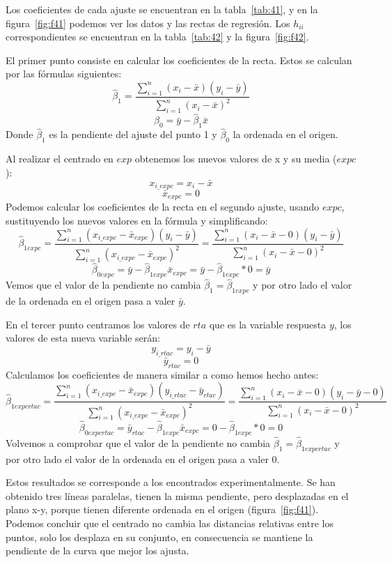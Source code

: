 \documentclass[a4paper]{article}
\begin{document}
Los coeficientes de cada ajuste se encuentran en la tabla~\ref{tab:41}, y en la figura~\ref{fig:f41} podemos ver los datos y las rectas de regresión. Los $h_{ii}$ correspondientes se encuentran en la tabla~\ref{tab:42} y la figura~\ref{fig:f42}. \par

El primer punto consiste en calcular los coeficientes de la recta. Estos se calculan por las fórmulas siguientes: 
\[ \hat{\beta}_1 = \frac{\sum_{i=1}^n(x_i - \bar{x})(y_i - \bar{y})}{\sum_{i=1}^n(x_{i} - \bar{x})^2} \]
\[ \hat{\beta}_0 = \bar{y} - \hat{\beta}_1\bar{x}\]
Donde $\hat{\beta}_1$ es la pendiente del ajuste del punto 1 y $\hat{\beta}_0$ la ordenada en el origen.\par
Al realizar el centrado en $exp$ obtenemos los nuevos valores de x y su media ($expc$): 
\[ x_{i\_expc} = x_{i} - \bar{x} \]
\[\bar{x}_{expc} = 0\]
Podemos calcular los coeficientes de la recta en el segundo ajuste, usando $expc$, sustituyendo los nuevos valores en la fórmula y simplificando: 
\[ \hat{\beta}_{1expc} = \frac{\sum_{i=1}^n(x_{i\_expc} - \bar{x}_{expc})(y_i - \bar{y})}{\sum_{i=1}^n(x_{i\_expc} - \bar{x}_{expc})^2} = \frac{\sum_{i=1}^n(x_{i} - \bar{x} - 0)(y_i - \bar{y})}{\sum_{i=1}^n(x_{i} - \bar{x} - 0)^2} \]
\[ \hat{\beta}_{0expc} = \bar{y} - \hat{\beta}_{1expc}\bar{x}_{expc} = \bar{y} - \hat{\beta}_{1expc} * 0 = \bar{y}\]
Vemos que el valor de la pendiente no cambia $\hat{\beta}_1 = \hat{\beta}_{1expc} $ y por otro lado el valor de la ordenada en el origen pasa a valer $\bar{y}$. \par
En el tercer punto centramos los valores de $rta$ que es la variable respuesta $y$, los valores de esta nueva variable serán:
\[ y_{i\_rtac} = y_{i} - \bar{y} \]
\[\bar{y}_{rtac} = 0\]
Calculamos los coeficientes de manera similar a como hemos hecho antes: 
\[ \hat{\beta}_{1expcrtac} = \frac{\sum_{i=1}^n(x_{i\_expc} - \bar{x}_{expc})(y_{i\_rtac} - \bar{y}_{rtac})}{\sum_{i=1}^n(x_{i\_expc} - \bar{x}_{expc})^2} = \frac{\sum_{i=1}^n(x_{i} - \bar{x} - 0)(y_i - \bar{y} - 0)}{\sum_{i=1}^n(x_{i} - \bar{x} - 0)^2} \]
\[ \hat{\beta}_{0expcrtac} = \bar{y}_{rtac} - \hat{\beta}_{1expc}\bar{x}_{expc} = 0 - \hat{\beta}_{1expc} * 0 = 0\]
Volvemos a comprobar que el valor de la pendiente no cambia $\hat{\beta}_1 = \hat{\beta}_{1expcrtac} $ y por otro lado el valor de la ordenada en el origen pasa a valer 0. \par
Estos resultados se corresponde a los encontrados experimentalmente. Se han obtenido tres líneas paralelas, tienen la misma pendiente, pero desplazadas en el plano x-y, porque tienen diferente ordenada en el origen (figura~\ref{fig:f41}). Podemos concluir que el centrado no cambia las distancias relativas entre los puntos, solo los desplaza en su conjunto, en consecuencia se mantiene la pendiente de la curva que mejor los ajusta. \par
\end{document}
